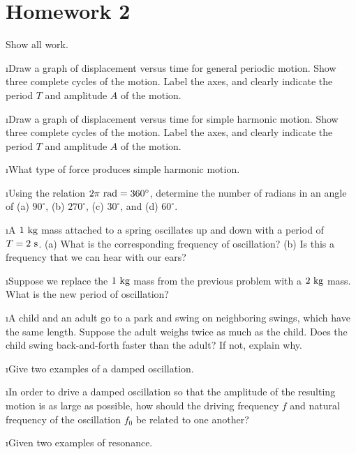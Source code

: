 \section{Homework 2}

\noindent
Show all work.

\ben
\i Draw a graph of displacement versus time for 
general periodic motion.
Show three complete cycles of the motion.
Label the axes, and clearly indicate the period
$T$ and amplitude $A$ of the motion.

\i Draw a graph of displacement versus time for 
simple harmonic motion.
Show three complete cycles of the motion.
Label the axes, and clearly indicate the period
$T$ and amplitude $A$ of the motion.

\i What type of force produces simple harmonic motion.

\i Using the relation $2\pi~{\rm rad} = 360^\circ$,
determine the number of radians in an angle of
(a) $90^\circ$, (b) $270^\circ$, (c) $30^\circ$, and
(d) $60^\circ$.

\i A $1~{\rm kg}$ mass attached to a spring oscillates
up and down with a period of $T=2~{\rm s}$.
(a) What is the corresponding frequency of oscillation?
(b) Is this a frequency that we can hear with our ears?

\i Suppose we replace the $1~{\rm kg}$ mass from the 
previous problem with a $2~{\rm kg}$ mass.
What is the new period of oscillation?

\i A child and an adult go to a park and swing on 
neighboring swings, which have the same length.
Suppose the adult weighs twice as much as the child.
Does the child swing back-and-forth faster than the 
adult?
If not, explain why.

\i Give two examples of a damped oscillation.

\i In order to drive a damped oscillation so that 
the amplitude of the resulting motion is as large
as possible, how should the driving frequency
$f$ and natural frequency of the oscillation $f_0$
be related to one another?

\i Given two examples of resonance.

\een

